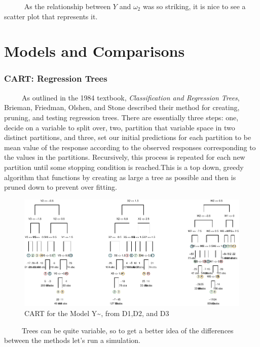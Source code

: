 \documentclass[12pt,twoside]{reedthesis}
\begin{document}
  ~~~~~ As the relationship between \(Y\) and \(\omega_2\) was so
  striking, it is nice to see a scatter plot that represents it.
  
  \section{Models and Comparisons}\label{models-and-comparisons}
  
  \subsubsection{CART: Regression Trees}\label{cart-regression-trees}
  
  ~~~~~As outlined in the 1984 textbook, \emph{Classification and
  Regression Trees}, Brieman, Friedman, Olshen, and Stone described their
  method for creating, pruning, and testing regression trees. There are
  essentially three steps: one, decide on a variable to split over, two,
  partition that variable space in two distinct partitions, and three, set
  our initial predictions for each partition to be mean value of the
  response according to the observed responses corresponding to the values
  in the partitions. Recursively, this process is repeated for each new
  partition until some stopping condition is reached.This is a top down,
  greedy algorithm that functions by creating as large a tree as possible
  and then is pruned down to prevent over fitting.
  
  \begin{figure}[htbp]
  \centering
  \includegraphics{Thesis_files/figure-latex/carts-1.pdf}
  \caption{\label{fig:carts}CART for the Model Y\textasciitilde{}, from D1,D2,
  and D3}
  \end{figure}
  
  ~~~~~Trees can be quite variable, so to get a better idea of the
  differences between the methods let's run a simulation.
  
\end{document}
